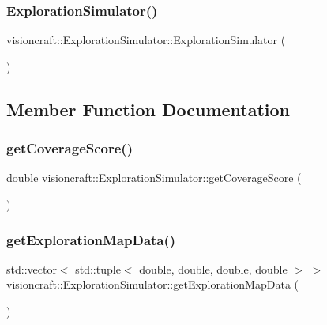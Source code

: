 \subsubsection{\texorpdfstring{Exploration\+Simulator()}{ExplorationSimulator()}}
{\footnotesize\ttfamily visioncraft\+::\+Exploration\+Simulator\+::\+Exploration\+Simulator (\begin{DoxyParamCaption}{ }\end{DoxyParamCaption})}



\subsection{Member Function Documentation}
\mbox{\label{classvisioncraft_1_1ExplorationSimulator_a7a31a8a2ac789b2b5675c3c90bfd52c5}} 
\subsubsection{\texorpdfstring{get\+Coverage\+Score()}{getCoverageScore()}}
{\footnotesize\ttfamily double visioncraft\+::\+Exploration\+Simulator\+::get\+Coverage\+Score (\begin{DoxyParamCaption}{ }\end{DoxyParamCaption})}

\mbox{\label{classvisioncraft_1_1ExplorationSimulator_a2f1812483e24e0c27454e6016cd3808d}} 
\subsubsection{\texorpdfstring{get\+Exploration\+Map\+Data()}{getExplorationMapData()}}
{\footnotesize\ttfamily std\+::vector$<$ std\+::tuple$<$ double, double, double, double $>$ $>$ visioncraft\+::\+Exploration\+Simulator\+::get\+Exploration\+Map\+Data (\begin{DoxyParamCaption}{ }\end{DoxyParamCaption})}

